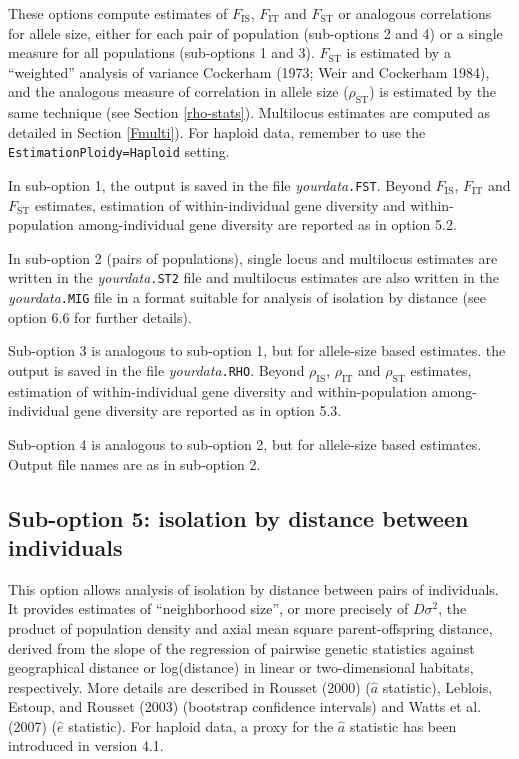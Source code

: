 \documentclass[12pt,]{book}
\begin{document}
These options compute estimates of \(F_\mathrm{IS}\), \(F_\mathrm{IT}\)
and \(F_\mathrm{ST}\) or analogous correlations for allele size, either
for each pair of population (sub-options 2 and 4) or a single measure
for all populations (sub-options 1 and 3). \(F_\mathrm{ST}\) is
estimated by a ``weighted'' analysis of variance Cockerham (1973; Weir
and Cockerham 1984), and the analogous measure of correlation in allele
size (\(\rho_\mathrm{ST}\)) is estimated by the same technique (see
Section \ref{rho-stats}). Multilocus estimates are computed as detailed
in Section \ref{Fmulti}). For haploid data, remember
to use the \texttt{EstimationPloidy=Haploid} setting.

In sub-option 1, the output is saved in the file
\emph{yourdata}\texttt{.FST}. Beyond \(F_\mathrm{IS}\),
\(F_\mathrm{IT}\) and \(F_\mathrm{ST}\) estimates, estimation of
within-individual gene diversity and within-population among-individual
gene diversity are reported as in option 5.2.

In sub-option 2 (pairs of populations), single locus and multilocus
estimates are written in the \emph{yourdata}\texttt{.ST2} file and
multilocus estimates are also written in the
\emph{yourdata}\texttt{.MIG} file in a format suitable for analysis of
isolation by distance (see option 6.6 for further details).

Sub-option 3 is analogous to sub-option 1, but for allele-size based
estimates. the output is saved in the file \emph{yourdata}\texttt{.RHO}.
Beyond \(\rho_\mathrm{IS}\), \(\rho_\mathrm{IT}\) and
\(\rho_\mathrm{ST}\) estimates, estimation of within-individual gene
diversity and within-population among-individual gene diversity are
reported as in option 5.3.

Sub-option 4 is analogous to sub-option 2, but for allele-size based
estimates. Output file names are as in sub-option 2.

\subsection{Sub-option 5: isolation by distance between
individuals}\label{sub-option-5-isolation-by-distance-between-individuals}

This option allows analysis of isolation by distance between pairs of
individuals. It provides estimates of ``neighborhood
size'', or more
precisely of \(D\sigma^2\), the product of population density and axial
mean square parent-offspring distance, derived from the slope of the
regression of pairwise genetic statistics against geographical distance
or log(distance) in linear or two-dimensional habitats, respectively.
More details are described in Rousset (2000) (\(\hat{a}\) statistic),
Leblois, Estoup, and Rousset (2003) (bootstrap confidence intervals) and
Watts et al. (2007) (\(\hat{e}\) statistic). For haploid data, a proxy
for the \(\hat{a}\) statistic has been introduced in version 4.1.
\end{document}
